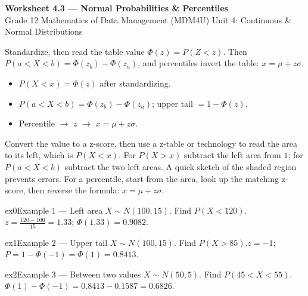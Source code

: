 \documentclass[11pt]{article}
\begin{document}
\begin{center}
{\LARGE\bfseries\color{titleblue}Worksheet 4.3 --- Normal Probabilities \& Percentiles}\\[2pt]
{\small Grade 12 Mathematics of Data Management (MDM4U) \textperiodcentered{} Unit 4: Continuous \& Normal Distributions}
\end{center}

\begin{ideabox}
Standardize, then read the table value $\Phi(z)=P(Z<z)$. Then $P(a<X<b)=\Phi(z_b)-\Phi(z_a)$, and percentiles invert the table: $x=\mu+z\sigma$.
\begin{itemize}[leftmargin=*,itemsep=2pt]
  \item $P(X<x)=\Phi(z)$ after standardizing.
  \item $P(a<X<b)=\Phi(z_b)-\Phi(z_a)$; upper tail $=1-\Phi(z)$.
  \item Percentile $\to$ $z$ $\to$ $x=\mu+z\sigma$.
\end{itemize}
\end{ideabox}

\begin{learnbox}
Convert the value to a z-score, then use a z-table or technology to read the area to its left, which is $P(X<x)$.
For $P(X>x)$ subtract the left area from $1$; for $P(a<X<b)$ subtract the two left areas. A quick sketch of the shaded region prevents errors.
For a percentile, start from the area, look up the matching z-score, then reverse the formula: $x=\mu+z\sigma$.
\end{learnbox}


\begin{example}{ex0}{Example 1 --- Left area}
$X\sim N(100,15)$. Find $P(X<120)$.\soln $z=\tfrac{120-100}{15}=1.33$; $\Phi(1.33)=0.9082$.
\end{example}

\begin{example}{ex1}{Example 2 --- Upper tail}
$X\sim N(100,15)$. Find $P(X>85)$.\soln $z=-1$; $P=1-\Phi(-1)=\Phi(1)=0.8413$.
\end{example}

\begin{example}{ex2}{Example 3 --- Between two values}
$X\sim N(50,5)$. Find $P(45<X<55)$.\soln $\Phi(1)-\Phi(-1)=0.8413-0.1587=0.6826$.
\end{example}
\end{document}

